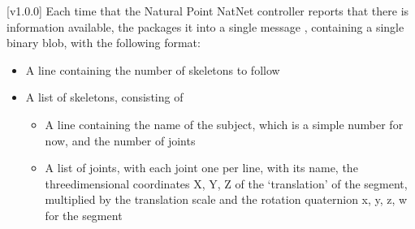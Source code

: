 [v1.0.0]
Each time that the Natural Point NatNet controller reports that there is information
available, the  packages it into a single message
\openSq{}\closeSq, containing a single binary blob, with the following
format:
\begin{itemize}
\item A line containing the number of skeletons to follow
\item\exSp{}A list of skeletons, consisting of
\begin{itemize}
\item A line containing the name of the subject, which is a simple number for now, and the
number of joints
\item\exSp{}A list of joints, with each joint one per line, with its name, the
three\longDash{}dimensional coordinates \openSq{}X, Y, Z\closeSq{} of the `translation'
of the segment, multiplied by the translation scale and the rotation quaternion
\openSq{}x, y, z, w\closeSq{} for the segment
\end{itemize}
\end{itemize}
\appendixEnd{}
